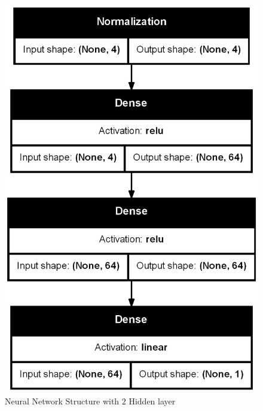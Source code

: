\begin{figure}[H]
\begin{minipage}{0.4\textwidth}
      \includegraphics[width=\linewidth]{images/Results/Neural Net/2HL/structure.png}
      \caption{Neural Network Structure with $2$ Hidden layer}


  \end{minipage}
\end{figure}

